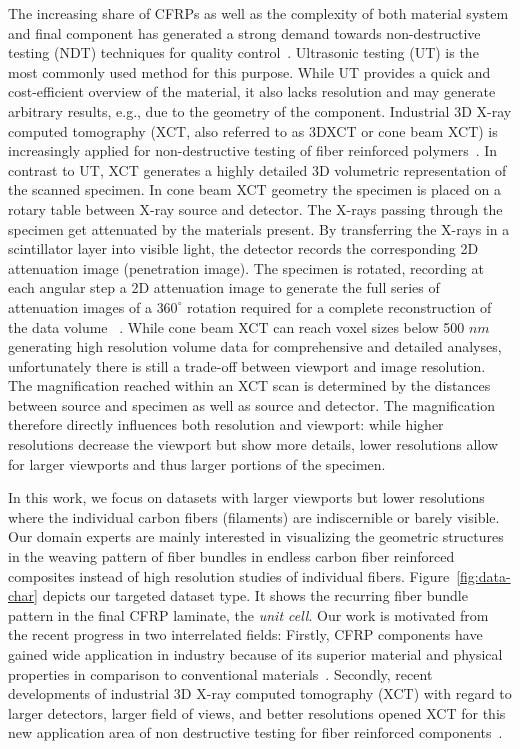 The increasing share of CFRPs as well as the complexity of both material system and final component has generated a strong demand towards non-destructive testing (NDT) techniques for quality control~\cite{Red2012}. Ultrasonic testing (UT) is the most commonly used method for this purpose. While UT provides a quick and cost-efficient overview of the material, it also lacks resolution and may generate arbitrary results, e.g., due to the geometry of the component. Industrial 3D X-ray computed tomography (XCT, also referred to as 3DXCT or cone beam XCT) is increasingly applied for non-destructive testing of fiber reinforced polymers~\cite{Kastner2012}. In contrast to UT, XCT generates a highly detailed 3D volumetric representation of the scanned specimen. In cone beam XCT geometry the specimen is placed on a rotary table between X-ray source and detector. The X-rays passing through the specimen get attenuated by the materials present. By transferring the X-rays in a scintillator layer into visible light, the detector records the corresponding 2D attenuation image (penetration image). The specimen is rotated, recording at each angular step a 2D attenuation image to generate the full series of attenuation images of a $360^\circ$ rotation required for a complete reconstruction of the data volume ~\cite{heinzl-2008-thesis}. 
While cone beam XCT can reach voxel sizes below 500 $nm$ generating high resolution volume data for comprehensive and detailed analyses, unfortunately there is still a trade-off between viewport and image resolution. The magnification reached within an XCT scan is determined by the distances between source and specimen as well as source and detector. The magnification therefore directly influences both resolution and viewport: while higher resolutions decrease the viewport but show more details, lower resolutions allow for larger viewports and thus larger portions of the specimen.

In this work, we focus on datasets with larger viewports but
lower resolutions where the individual carbon fibers (filaments) are indiscernible or barely visible. Our domain experts are mainly interested in visualizing the geometric structures in the weaving pattern of fiber bundles in endless carbon fiber reinforced composites instead of high resolution studies of individual fibers.
Figure~\ref{fig:data-char} depicts our targeted dataset type. It shows the recurring fiber bundle pattern in the final CFRP laminate, the \textit{unit cell}.
Our work is motivated from the recent progress in two interrelated fields: Firstly, CFRP components have gained wide application in industry because of its superior material and physical properties in comparison to conventional materials~\cite{Karpat2012}. Secondly, recent developments of industrial 3D X-ray computed tomography (XCT) with regard to larger detectors, larger field of views, and better resolutions opened XCT for this new application area of non destructive testing for fiber reinforced components~\cite{Schilling2005}. 


